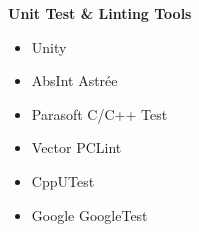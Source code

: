 \begin{minipage}[t]{0.48\textwidth}
\vspace{0.5em}

\textbf{Unit Test \& Linting Tools}
\begin{itemize}[leftmargin=*,noitemsep,topsep=0pt]
    \item Unity 
    \item AbsInt Astrée 
    \item Parasoft C/C++ Test 
    \item Vector PCLint 
    \item CppUTest 
    \item Google GoogleTest 
\end{itemize}
\end{minipage}